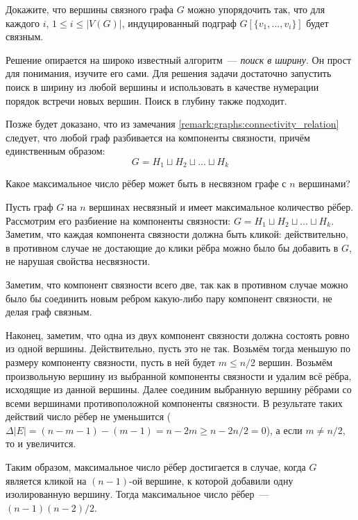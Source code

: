 \begin{Exercise}[counter=SecExercise]
    \noindent
    Докажите, что вершины связного графа $ G $ можно упорядочить так,
    что для каждого $ i $, $ 1 \leqslant i \leqslant |V(G)| $,
    индуцированный подграф $ G[\{v_1, \ldots, v_i \}] $ будет связным.
\end{Exercise}

\begin{Answer}
    \noindent
    Решение опирается на широко известный алгоритм~--- \emph{поиск в ширину}.
    Он прост для понимания, изучите его сами.
    Для решения задачи достаточно запустить поиск в ширину из любой вершины
    и использовать в качестве нумерации порядок встречи новых вершин.
    Поиск в глубину также подходит.
\end{Answer}


\begin{remark}
    \label{remark:graphs:cc_partition}
    Позже будет доказано, что из замечания \ref{remark:graphs:connectivity_relation} следует, что любой граф разбивается на компоненты связности, причём единственным образом:
    \[
        G = H_1 \sqcup H_2 \sqcup \ldots \sqcup H_k
    \]
\end{remark}


\begin{Exercise}[counter=SecExercise]
    \noindent
    Какое максимальное число рёбер может быть в несвязном графе с $ n $ вершинами?
\end{Exercise}

\begin{Answer}
    \noindent
    Пусть граф $ G $ на $ n $ вершинах несвязный и имеет максимальное количество рёбер.
    Рассмотрим его разбиение на компоненты связности: $ G = H_1 \sqcup H_2 \sqcup \ldots \sqcup H_k $.
    Заметим, что каждая компонента связности должна быть кликой:
    действительно, в противном случае не достающие до клики рёбра можно было бы добавить в $ G $,
    не нарушая свойства несвязности.

    Заметим, что компонент связности всего две,
    так как в противном случае можно было бы соединить новым ребром какую-либо пару компонент связности,
    не делая граф связным.

    Наконец, заметим, что одна из двух компонент связности должна состоять ровно из одной вершины.
    Действительно, пусть это не так.
    Возьмём тогда меньшую по размеру компоненту связности, пусть в ней будет $ m \leqslant n/2 $ вершин.
    Возьмём произвольную вершину из выбранной компоненты связности и удалим всё рёбра,
    исходящие из данной вершины.
    Далее соединим выбранную вершину рёбрами со всеми вершинами противоположной компоненты связности.
    В результате таких действий число рёбер не уменьшится ($ \Delta |E| = (n - m - 1) - (m - 1) = n - 2 m \geqslant n - 2 n / 2 = 0 $),
    а если $ m \neq n/2 $, то и увеличится.

    Таким образом, максимальное число рёбер достигается в случае, когда $ G $ является кликой на $ (n - 1) $-ой вершине,
    к которой добавили одну изолированную вершину.
    Тогда максимальное число рёбер~--- $ (n - 1)(n - 2) / 2 $.
\end{Answer}


